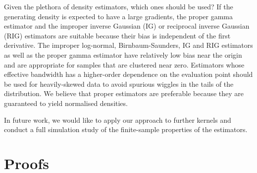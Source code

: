 Given the plethora of density estimators, which ones should be used? If the generating density is expected to have a large gradients, the proper gamma estimator and the improper inverse Gaussian (IG) or reciprocal inverse Gaussian (RIG) estimators are suitable because their bias is independent of the first derivative. The improper log-normal, Birnbaum-Saunders, IG and RIG estimators as well as the proper gamma estimator have relatively low bias near the origin and are appropriate for samples that are clustered near zero. Estimators whose effective bandwidth has a higher-order dependence on the evaluation point should be used for heavily-skewed data to avoid spurious wiggles in the tails of the distribution. We believe that proper estimators are preferable because they are guaranteed to yield normalised densities.

In future work, we would like to apply our approach to further kernels and conduct a full simulation study of the finite-sample properties of the estimators.

\appendix

\section{Proofs}

